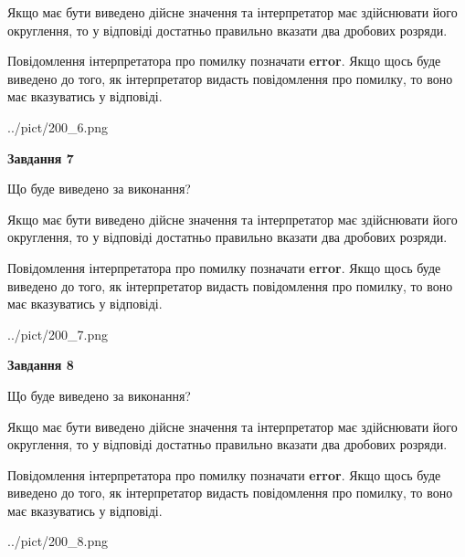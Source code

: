 \documentclass[12pt, ukrainian]{article}
\begin{document}
{\begin {Large}
Якщо має бути виведено дійсне значення та інтерпретатор має здійснювати його округлення, 
то у відповіді достатньо правильно вказати два дробових розряди.

Повідомлення інтерпретатора про помилку позначати \textbf{error}.
Якщо щось буде виведено до того, як інтерпретатор видасть повідомлення про помилку, 
то воно має вказуватись у відповіді. \par

\begin{center}
	{../pict/200_6.png}
\end{center}
\newpage

{\begin {center}\textbf{Завдання 7}\end {center}}\par
Що буде виведено за виконання? \par

Якщо має бути виведено дійсне значення та інтерпретатор має здійснювати його округлення, 
то у відповіді достатньо правильно вказати два дробових розряди.

Повідомлення інтерпретатора про помилку позначати \textbf{error}.
Якщо щось буде виведено до того, як інтерпретатор видасть повідомлення про помилку, 
то воно має вказуватись у відповіді. \par

\begin{center}
	{../pict/200_7.png}
\end{center}
\newpage

{\begin {center}\textbf{Завдання 8}\end {center}}\par
Що буде виведено за виконання? \par

Якщо має бути виведено дійсне значення та інтерпретатор має здійснювати його округлення, 
то у відповіді достатньо правильно вказати два дробових розряди.

Повідомлення інтерпретатора про помилку позначати \textbf{error}.
Якщо щось буде виведено до того, як інтерпретатор видасть повідомлення про помилку, 
то воно має вказуватись у відповіді. \par

\begin{center}
	{../pict/200_8.png}
\end{center}
\newpage


\end{Large}}
\end{document}
